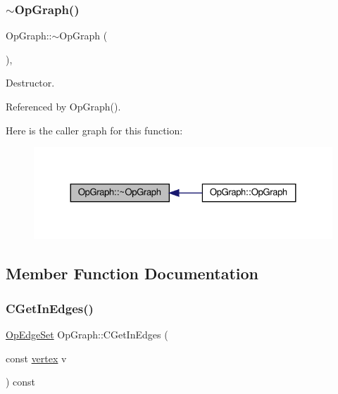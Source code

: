 \subsubsection{\texorpdfstring{$\sim$\+Op\+Graph()}{~OpGraph()}}
{\footnotesize\ttfamily Op\+Graph\+::$\sim$\+Op\+Graph (\begin{DoxyParamCaption}{ }\end{DoxyParamCaption})\hspace{0.3cm}{\ttfamily [override]}, {\ttfamily [default]}}



Destructor. 



Referenced by Op\+Graph().

Here is the caller graph for this function\+:
\nopagebreak
\begin{figure}[H]
\begin{center}
\leavevmode
\includegraphics[width=324pt]{d6/d79/structOpGraph_a7d9ade95757bf16fcf7df469f71bada7_icgraph}
\end{center}
\end{figure}


\subsection{Member Function Documentation}
\mbox{\label{structOpGraph_a9619c072b9bc1e6990db32d43fb358ef}} 
\subsubsection{\texorpdfstring{C\+Get\+In\+Edges()}{CGetInEdges()}}
{\footnotesize\ttfamily \hyperlink{classOpEdgeSet}{Op\+Edge\+Set} Op\+Graph\+::\+C\+Get\+In\+Edges (\begin{DoxyParamCaption}\item[{const \hyperlink{graph_8hpp_abefdcf0544e601805af44eca032cca14}{vertex}}]{v }\end{DoxyParamCaption}) const}




